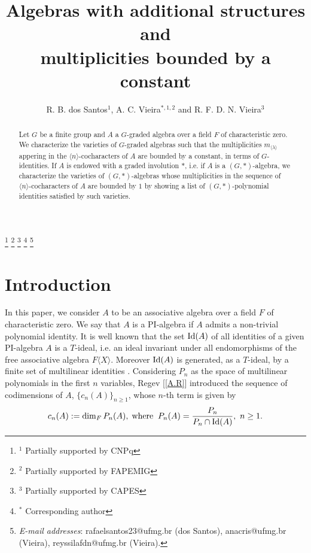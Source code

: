\documentclass{amsart}
\newcommand{\Id}[1]{\ensuremath{\textnormal{Id}({#1})}}
\numberwithin{equation}{section}
\begin{document}
	\title{Algebras with additional structures and \\ multiplicities bounded by a constant }


\author[R. B. dos Santos, A. C Vieira and R. F. D. N. Vieira]{
	R. B.  dos Santos$^{1}$, A. C.  Vieira$^{*, 1, 2}$  and R. F. D. N. Vieira$^{3}$}
	


\thanks{\footnotesize $^{1}$ Partially supported by CNPq}
\thanks{\footnotesize $^{2}$ Partially supported by FAPEMIG}
\thanks{\footnotesize $^{3}$ Partially supported by CAPES}
\thanks{\footnotesize {$^*$ Corresponding author}}
\thanks{\footnotesize {\it E-mail addresses}: rafaelsantos23@ufmg.br (dos Santos), anacris@ufmg.br (Vieira), reyssilafdn@ufmg.br (Vieira).}




\begin{abstract} 
Let 
$G$ be a finite group and 
$A$ a $G$-graded algebra over a field $F$ of characteristic zero. We characterize the 
varieties of $G$-graded algebras such that the multiplicities $m_{\langle \lambda \rangle}$ appering in the  $\langle n \rangle $-cocharacters of $A$ are bounded by a constant, in terms of $G$-identities. If $A$ is endowed with a graded involution $\ast$, i.e. if $A$ is a $(G,\ast)$-algebra, we characterize the varieties of 
$(G,*)$-algebras whose multiplicities in the sequence of $\langle n\rangle$-cocharacters of $A$ are bounded by $1$  by showing a list of $(G,\ast)$-polynomial identities satisfied by such varieties.

\end{abstract}

\maketitle

\section{Introduction}
In this paper, we consider $A$ to be an  associative algebra over a field $F$ of characteristic zero.  We say that $A$ is a PI-algebra if $A$ admits a non-trivial polynomial identity. 
It is well known that the set $\Id A$ of all identities of a given PI-algebra $A$ is a $T$-ideal, i.e. an ideal invariant under all endomorphisms of the
free associative algebra $F\langle X\rangle$. Moreover $\Id A$ is generated, as a $T$-ideal, by a finite set of multilinear identities \cite{Kemer}. Considering $P_n$ as the space of multilinear polynomials in the first $n$ variables,
 Regev [\ref{A.R}] introduced the sequence of codimensions of  $A$, $\{c_n(A)\}_{n\geq 1}$,
whose $n$-th term is given by
$$c_n(A):=\dim_F P_n(A), \; \mbox{where}\;\; P_n(A)=\frac{P_n}{P_n \cap \Id A},~  n \ge 1.$$
\end{document}

